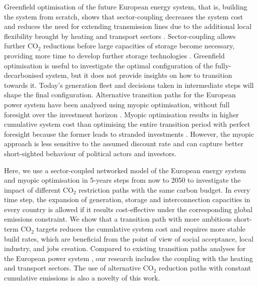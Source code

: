 \documentclass[5p]{elsarticle} %
\begin{document}
Greenfield optimisation of the future European energy system, that is, building the system from scratch, shows that sector-coupling decreases the system cost and reduces the need for extending transmission lines due to the additional local flexibility brought by heating and transport sectors \cite{Brown_2018}. Sector-coupling allows further CO$_2$ reductions before large capacities of storage become necessary, providing more time to develop further storage technologies \cite{Victoria_2019_storage}. Greenfield optimisation is useful to investigate the optimal configuration of the fully-decarbonised system, but it does not provide insights on how to transition towards it. Today's generation fleet and decisions taken in intermediate steps will shape the final configuration. 
Alternative transition paths for the European power system have been analysed using myopic optimisation, without full foresight over the investment horizon \cite{Bogdanov_2019, Plesmann_2017, Gerbaulet_2019, Poncelet_2016}. Myopic optimisation results in higher cumulative system cost than optimising the entire transition period with perfect foresight because the former leads to stranded investments \cite{Gerbaulet_2019, Heuberger_2018}. However, the myopic approach is less sensitive to the assumed discount rate and can capture better short-sighted behaviour of political actors and investors. 

Here, we use a sector-coupled networked model of the European energy system and myopic optimisation in 5-years steps from now to 2050 to investigate the impact of different CO$_2$ restriction paths with the same carbon budget. In every time step, the expansion of generation, storage and interconnection capacities in every country is allowed  if it results cost-effective under the corresponding global emissions constraint. We show that a transition path with more ambitious short-term CO$_2$ targets reduces the cumulative system cost and requires more stable build rates, which are beneficial from the point of view of social acceptance, local industry, and jobs creation. Compared to existing transition paths analyses for the European power system \cite{Plesmann_2017, Gerbaulet_2019, Poncelet_2016}, our research includes the coupling with the heating and transport sectors. The use of alternative CO$_2$ reduction paths with constant cumulative emissions is also a novelty of this work. 
\end{document}
